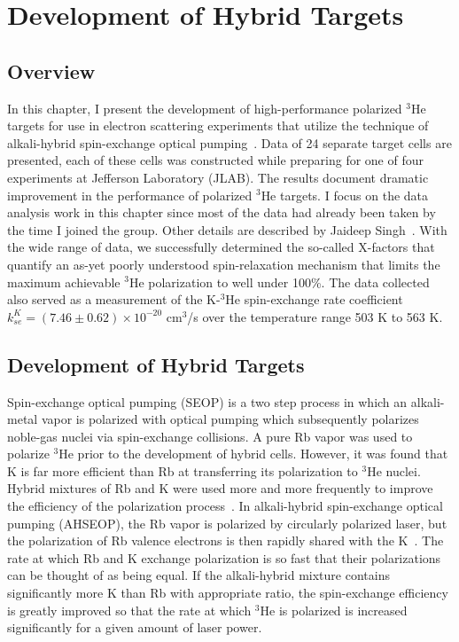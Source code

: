 \chapter{Development of Hybrid Targets}
\label{chap4}

\section{Overview}

In this chapter, I present the development of high-performance polarized $^{3}$He targets for use in electron scattering experiments that utilize the technique of alkali-hybrid spin-exchange optical pumping~\cite{PhysRevC.91.055205}. Data of 24 separate target cells are presented, each of these cells was constructed while preparing for one of four experiments at Jefferson Laboratory (JLAB). The results document dramatic improvement in the performance of polarized $^{3}$He targets. I focus on the data analysis work in this chapter since most of the data had already been taken by the time I joined the group. Other details are described by Jaideep Singh~\cite{PhysRevC.91.055205}. With the wide range of data, we successfully determined the so-called X-factors that quantify an as-yet poorly understood spin-relaxation mechanism that limits the maximum achievable $^{3}$He polarization to well under 100\%. The data collected also served as a measurement of the K-$^{3}$He spin-exchange rate coefficient $k_{se}^{K}=(7.46\pm0.62)\times10^{-20}$ cm$^{3}$/s over the temperature range 503 K to 563 K.

\section{Development of Hybrid Targets}

Spin-exchange optical pumping (SEOP) is a two step process in which an alkali-metal vapor is polarized with optical pumping which subsequently polarizes noble-gas nuclei via spin-exchange collisions\cite{WalkerHapper}. A pure Rb vapor was used to polarize $^{3}$He prior to the development of hybrid cells. However, it was found that K is far more efficient than Rb at transferring its polarization to $^{3}$He nuclei. Hybrid mixtures of Rb and K were used more and more frequently to improve the efficiency of the polarization process~\cite{PhysRevA.56.2090, PhysRevLett.80.2801}. In alkali-hybrid spin-exchange optical pumping (AHSEOP), the Rb vapor is polarized by circularly polarized laser, but the polarization of Rb valence electrons is then rapidly shared with the K~\cite{PhysRevLett.91.123003}. The rate at which Rb and K exchange polarization is so fast that their polarizations can be thought of as being equal. If the alkali-hybrid mixture contains significantly more K than Rb with appropriate ratio, the spin-exchange efficiency is greatly improved so that the rate at which $^{3}$He is polarized is increased significantly for a given amount of laser power.

